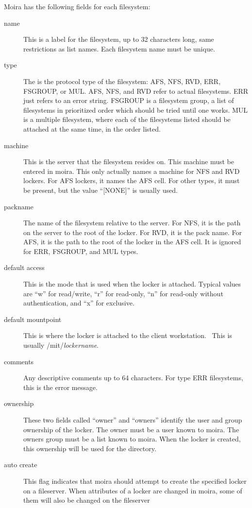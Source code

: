 \documentclass{book}
\begin{document}
Moira has the following fields for each filesystem:
\begin{description}
\item[name] This is a label for the filesystem, up to 32 characters long,
same restrictions as list names.  Each filesystem name must be unique.
\item[type] The is the protocol type of the filesystem: AFS, NFS, RVD, ERR,
FSGROUP, or MUL.  AFS, NFS, and RVD refer to actual filesystems.  ERR
just refers to an error string.  FSGROUP is a filesystem group, a list
of filesystems in prioritized order which should be tried until one
works.  MUL is a multiple filesystem, where each of the filesystems
listed should be attached at the same time, in the order listed.
\item[machine] This is the server that the filesystem resides on.  This
machine must be entered in moira.  This only actually names a machine
for NFS and RVD lockers.  For AFS lockers, it names the AFS cell.  For
other types, it must be present, but the value ``[NONE]'' is usually used.
\item[packname] The name of the filesystem relative to the server.  For NFS,
it is the path on the server to the root of the locker.  For RVD, it
is the pack name.  For AFS, it is the path to the root of the locker
in the AFS cell.  It is ignored for ERR, FSGROUP, and MUL types.
\item[default access] This is the mode that is used when the locker is
attached.  Typical values are ``w'' for read/write, ``r'' for read-only,
``n'' for read-only without authentication, and ``x'' for exclusive.
\item[default mountpoint] This is where the locker is attached to the client
workstation.  \athena\ This is usually /mit/{\em lockername}.
\item[comments] Any descriptive comments up to 64 characters.  For type ERR
filesystems, this is the error message.
\item[ownership] These two fields called ``owner'' and ``owners'' identify
the user and group ownership of the locker.  The owner must be a user
known to moira.  The owners group must be a list known to moira.  When
the locker is created, this ownership will be used for the directory.
\item[auto create] This flag indicates that moira should attempt to create
the specified locker on a fileserver.  When attributes of a locker are
changed in moira, some of them will also be changed on the fileserver

\end{description}
\end{document}
